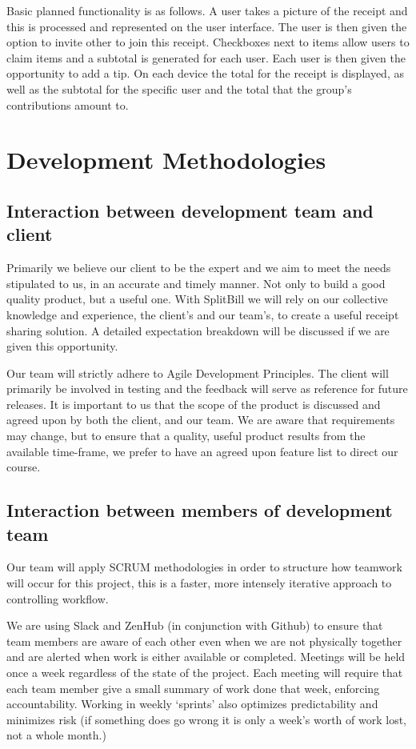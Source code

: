 \documentclass[12pt,a4paper]{article}
\begin{document}
   Basic planned functionality is as follows. A user takes a picture of the receipt and this is processed and represented on the user interface. The user is then given the option to invite other to join this receipt. Checkboxes
   next to items allow users to claim items and a subtotal is generated for each user. Each user is then given the opportunity to add a tip. On each device the total for the receipt is displayed, as well as the subtotal for the
   specific user and the total that the group's contributions amount to.

   \section{Development Methodologies}
   \subsection{Interaction between development team and client}
   Primarily we believe our client to be the expert and we aim to meet the needs stipulated to us, in an accurate and timely manner. Not only to build a good quality product, but a useful one. With SplitBill we will rely on our
   collective knowledge and experience, the client's and our team's, to create a useful receipt sharing solution. A detailed expectation breakdown will be discussed if we are given this opportunity.

   Our team will strictly adhere to Agile Development Principles. The client will primarily be involved in testing and the feedback will serve as reference for future releases. It is important to us that the scope of the product
   is discussed and agreed upon by both the client, and our team. We are aware that requirements may change, but to ensure that a quality, useful product results from the available time-frame, we prefer to have an agreed upon
   feature list to direct our course.

   \subsection{Interaction between members of development team}
   Our team will apply SCRUM methodologies in order to structure how teamwork will occur for this project, this is a faster, more intensely iterative approach to controlling workflow.

   We are using Slack and ZenHub (in conjunction with Github) to ensure that team members are aware of each other even when we are not physically together and are alerted when work is either available or completed.
	Meetings will be held once a week regardless of the state of the project. Each meeting will require that each team member give a small summary of work done that week, enforcing accountability.
   Working in weekly `sprints' also optimizes predictability and minimizes risk (if something does go wrong it is only a week's worth of work lost, not a whole month.)
\end{document}

